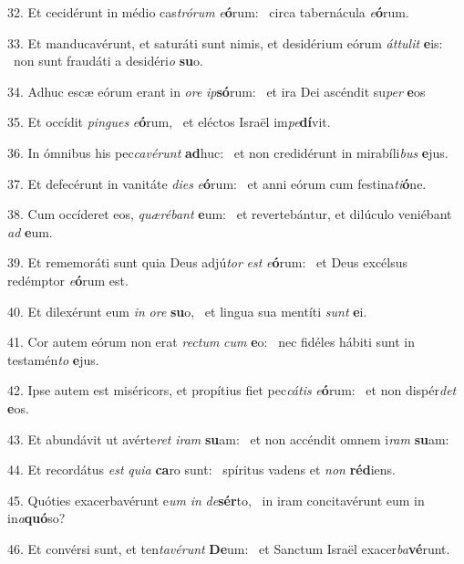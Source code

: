 32. Et cecidérunt in médio cas\textit{tró}\textit{rum} \textit{e}\textbf{ó}rum: \ast\  circa tabernácula \textit{e}\textbf{ó}rum.\

33. Et manducavérunt, et saturáti sunt nimis, et desidérium eórum \textit{át}\textit{tu}\textit{lit} \textbf{e}is: \ast\  non sunt fraudáti a desidéri\textit{o} \textbf{su}o.\

34. Adhuc escæ eórum erant in \textit{o}\textit{re} \textit{ip}\textbf{só}rum: \ast\  et ira Dei ascéndit su\textit{per} \textbf{e}os\

35. Et occídit \textit{pin}\textit{gues} \textit{e}\textbf{ó}rum, \ast\  et eléctos Israël im\textit{pe}\textbf{dí}vit.\

36. In ómnibus his pec\textit{ca}\textit{vé}\textit{runt} \textbf{ad}huc: \ast\  et non credidérunt in mirabíli\textit{bus} \textbf{e}jus.\

37. Et defecérunt in vanitáte \textit{di}\textit{es} \textit{e}\textbf{ó}rum: \ast\  et anni eórum cum festina\textit{ti}\textbf{ó}ne.\

38. Cum occíderet eos, \textit{quæ}\textit{ré}\textit{bant} \textbf{e}um: \ast\  et revertebántur, et dilúculo veniébant \textit{ad} \textbf{e}um.\

39. Et rememoráti sunt quia Deus adjú\textit{tor} \textit{est} \textit{e}\textbf{ó}rum: \ast\  et Deus excélsus redémptor \textit{e}\textbf{ó}rum est.\

40. Et dilexérunt eum \textit{in} \textit{o}\textit{re} \textbf{su}o, \ast\  et lingua sua mentíti \textit{sunt} \textbf{e}i.\

41. Cor autem eórum non erat \textit{rec}\textit{tum} \textit{cum} \textbf{e}o: \ast\  nec fidéles hábiti sunt in testamén\textit{to} \textbf{e}jus.\

42. Ipse autem est miséricors, et propítius fiet pec\textit{cá}\textit{tis} \textit{e}\textbf{ó}rum: \ast\  et non dispér\textit{det} \textbf{e}os.\

43. Et abundávit ut avérte\textit{ret} \textit{i}\textit{ram} \textbf{su}am: \ast\  et non accéndit omnem i\textit{ram} \textbf{su}am:\

44. Et recordátus \textit{est} \textit{qui}\textit{a} \textbf{ca}ro sunt: \ast\  spíritus vadens et \textit{non} \textbf{réd}iens.\

45. Quóties exacerbavérunt e\textit{um} \textit{in} \textit{de}\textbf{sér}to, \ast\  in iram concitavérunt eum in in\textit{a}\textbf{quó}so?\

46. Et convérsi sunt, et ten\textit{ta}\textit{vé}\textit{runt} \textbf{De}um: \ast\  et Sanctum Israël exacer\textit{ba}\textbf{vé}runt.\

